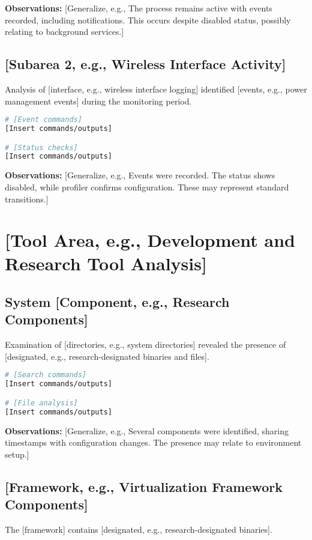 \documentclass[11pt, a4paper]{article}
\begin{document}
\textbf{Observations:} [Generalize, e.g., The process remains active with events recorded, including notifications. This occurs despite disabled status, possibly relating to background services.]

\subsection{[Subarea 2, e.g., Wireless Interface Activity]}
Analysis of [interface, e.g., wireless interface logging] identified [events, e.g., power management events] during the monitoring period.

\begin{lstlisting}[language=bash, caption={[Interface] Activity}, label={lst:wireless}]
# [Event commands]
[Insert commands/outputs]

# [Status checks]
[Insert commands/outputs]
\end{lstlisting}

\textbf{Observations:} [Generalize, e.g., Events were recorded. The status shows disabled, while profiler confirms configuration. These may represent standard transitions.]

\section{[Tool Area, e.g., Development and Research Tool Analysis]}

\subsection{System [Component, e.g., Research Components]}
Examination of [directories, e.g., system directories] revealed the presence of [designated, e.g., research-designated binaries and files].

\begin{lstlisting}[language=bash, caption={[Component] Analysis}, label={lst:research_components}]
# [Search commands]
[Insert commands/outputs]

# [File analysis]
[Insert commands/outputs]
\end{lstlisting}

\textbf{Observations:} [Generalize, e.g., Several components were identified, sharing timestamps with configuration changes. The presence may relate to environment setup.]

\subsection{[Framework, e.g., Virtualization Framework Components]}
The [framework] contains [designated, e.g., research-designated binaries].
\end{document}
